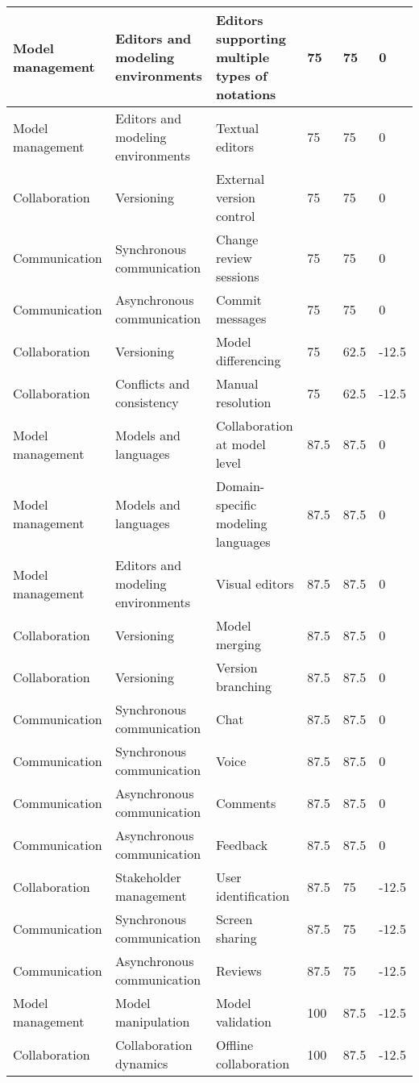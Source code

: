 \begin{table*}[]
\begin{tabular}{|l|l|l|l|l|l|}
Model management & Editors and modeling environments & Editors supporting multiple types of notations & 75 & 75 & 0 \\ \hline 
Model management & Editors and modeling environments & Textual editors & 75 & 75 & 0 \\ \hline 
Collaboration & Versioning & External version control & 75 & 75 & 0 \\ \hline 
Communication & Synchronous communication & Change review sessions & 75 & 75 & 0 \\ \hline 
Communication & Asynchronous communication & Commit messages & 75 & 75 & 0 \\ \hline 
Collaboration & Versioning & Model differencing & 75 & 62.5 & -12.5 \\ \hline 
Collaboration & Conflicts and consistency & Manual resolution & 75 & 62.5 & -12.5 \\ \hline 
Model management & Models and languages & Collaboration at model level & 87.5 & 87.5 & 0 \\ \hline 
Model management & Models and languages & Domain-specific modeling languages & 87.5 & 87.5 & 0 \\ \hline 
Model management & Editors and modeling environments & Visual editors & 87.5 & 87.5 & 0 \\ \hline 
Collaboration & Versioning & Model merging & 87.5 & 87.5 & 0 \\ \hline 
Collaboration & Versioning & Version branching & 87.5 & 87.5 & 0 \\ \hline 
Communication & Synchronous communication & Chat & 87.5 & 87.5 & 0 \\ \hline 
Communication & Synchronous communication & Voice & 87.5 & 87.5 & 0 \\ \hline 
Communication & Asynchronous communication & Comments & 87.5 & 87.5 & 0 \\ \hline 
Communication & Asynchronous communication & Feedback & 87.5 & 87.5 & 0 \\ \hline 
Collaboration & Stakeholder management & User identification & 87.5 & 75 & -12.5 \\ \hline 
Communication & Synchronous communication & Screen sharing & 87.5 & 75 & -12.5 \\ \hline 
Communication & Asynchronous communication & Reviews & 87.5 & 75 & -12.5 \\ \hline 
Model management & Model manipulation & Model validation & 100 & 87.5 & -12.5 \\ \hline 
Collaboration & Collaboration dynamics & Offline collaboration & 100 & 87.5 & -12.5 \\ \hline 

\end{tabular}
\end{table*}
